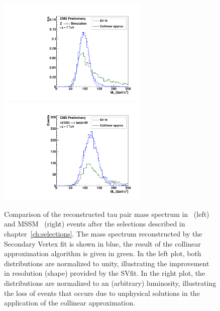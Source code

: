 \begin{figure}[t]
\begin{center}
\includegraphics*[width=72mm]{svfit_chapter/figures/sv_fit_approval_plots/sv_vs_coll_ZTT_normed.pdf}
\includegraphics*[width=72mm]{svfit_chapter/figures/sv_fit_approval_plots/sv_vs_coll_A120.pdf}
\caption[Comparison of SVfit with the Collinear Approximation
algorithm]{Comparison of the reconstructed tau pair mass spectrum in
\ZTT~(left) and MSSM ~(right) events after the selections described in
chapter~\ref{ch:selections}.  The mass spectrum reconstructed by the Secondary
Vertex fit is shown in blue, the result of the collinear approximation algorithm
is given in green.  In the left plot, both distributions are normalized to
unity, illustrating the improvement in resolution (shape) provided by the SVfit.
In the right plot, the distributions are normalized to an (arbitrary)
luminosity, illustrating the loss of events that occurs due to unphysical
solutions in the application of the collinear approximation.}

\label{fig:SVversusCollinear}
\end{center}
\end{figure} 

